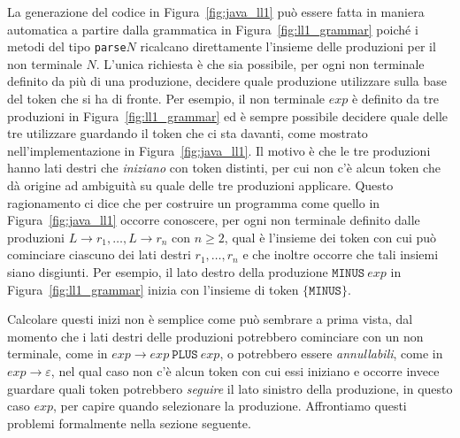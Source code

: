 La generazione del codice in Figura~\ref{fig:java_ll1} pu\`o essere
fatta in maniera automatica a partire dalla grammatica in
Figura~\ref{fig:ll1_grammar} poich\'e i metodi del tipo
\texttt{parse}$N$ ricalcano direttamente l'insieme delle produzioni
per il non terminale $N$. L'unica richiesta \`e che sia possibile,
per ogni non terminale definito da pi\`u di una produzione, decidere
quale produzione utilizzare sulla base del token che si ha di fronte.
Per esempio, il non terminale $\mathit{exp}$ \`e definito da tre
produzioni in Figura~\ref{fig:ll1_grammar} ed \`e sempre possibile
decidere quale delle tre utilizzare guardando il token che ci sta
davanti, come mostrato nell'implementazione in Figura~\ref{fig:java_ll1}.
Il motivo \`e che le tre produzioni hanno lati destri che \emph{iniziano} con
token distinti, per cui non c'\`e alcun token che d\`a origine ad
ambiguit\`a su quale delle tre produzioni applicare.
Questo ragionamento ci dice che per costruire un programma come quello
in Figura~\ref{fig:java_ll1} occorre conoscere, per ogni non terminale
definito dalle produzioni
$L\to r_1,\ldots,L\to r_n$ con $n\ge 2$, qual \`e l'insieme dei token con cui
pu\`o cominciare ciascuno dei lati destri $r_1,\ldots,r_n$ e che inoltre
occorre che tali insiemi siano disgiunti. Per esempio,
il lato destro della produzione $\mathtt{MINUS}\ \mathit{exp}$ in
Figura~\ref{fig:ll1_grammar} inizia con l'insieme di token
$\{\mathtt{MINUS}\}$.

Calcolare questi inizi non \`e \cosi semplice
come pu\`o sembrare a prima vista, dal momento che i lati destri delle
produzioni potrebbero cominciare con un non terminale, come
in $\mathit{exp}\to\mathit{exp}\ \mathtt{PLUS}\ \mathit{exp}$,
o potrebbero essere \emph{annullabili}, come in $\mathit{exp}\to\varepsilon$,
nel qual caso non c'\`e alcun token con cui essi iniziano e occorre
invece guardare quali token potrebbero \emph{seguire} il lato sinistro
della produzione, in questo caso $\mathit{exp}$, per capire quando
selezionare la produzione.
Affrontiamo questi problemi formalmente nella sezione seguente.
%
